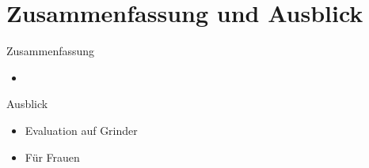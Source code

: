 \chapter{Zusammenfassung und Ausblick}
\label{summary}


Zusammenfassung
\begin{itemize}
    \item 
\end{itemize}


Ausblick
\begin{itemize}
    \item Evaluation auf Grinder
    \item Für Frauen
\end{itemize}